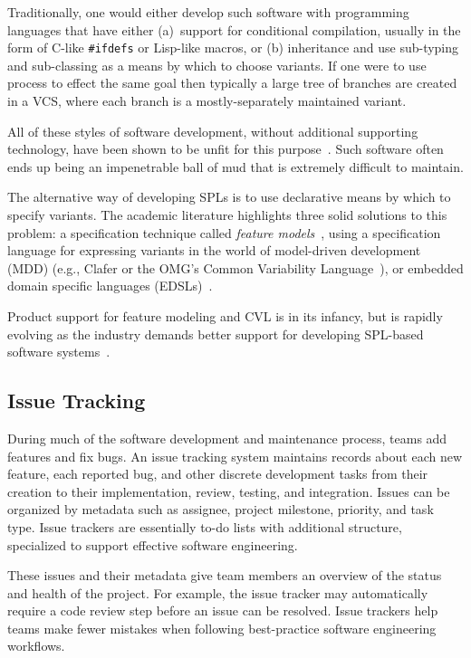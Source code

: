 Traditionally, one would either develop such software with programming
languages that have either (a)~support for conditional compilation,
usually in the form of C-like \texttt{\#ifdefs} or Lisp-like macros, or
(b) inheritance and use sub-typing and sub-classing as a means by which
to choose variants.  If one were to use process to effect the same
goal then typically a large tree of branches are created in a VCS,
where each branch is a mostly-separately maintained variant.

All of these styles of software development, without additional
supporting technology, have been shown to be unfit for this
purpose~\cite{linden2007software,kastner2008granularity,chen2009variability}.
Such software often ends up being an impenetrable ball of mud that is
extremely difficult to maintain.

The alternative way of developing SPLs is to use declarative means by
which to specify variants.  The academic literature highlights three
solid solutions to this problem: a specification technique called
\emph{feature models}~\cite{FMs}, using a specification language for
expressing variants in the world of model-driven development (MDD)
(e.g., Clafer or the OMG's Common Variability Language~\cite{CVL}), or
embedded domain specific languages (EDSLs)~\cite{EDSL}.

Product support for feature modeling and CVL is in its infancy, but is
rapidly evolving as the industry demands better support for developing
SPL-based software systems~\cite{bosch2002maturity,bockle2004calculating}.

\subsection{Issue Tracking}

During much of the software development and maintenance process, teams
add features and fix bugs. An issue tracking system maintains records
about each new feature, each reported bug, and other discrete
development tasks from their creation to their implementation, review,
testing, and integration. Issues can be organized by metadata such as
assignee, project milestone, priority, and task type. Issue trackers
are essentially to-do lists with additional structure, specialized to
support effective software engineering.

These issues and their metadata give team members an overview of the
status and health of the project. For example, the issue tracker may
automatically require a code review step before an issue can be
resolved. Issue trackers help teams make fewer mistakes when following
best-practice software engineering workflows.

